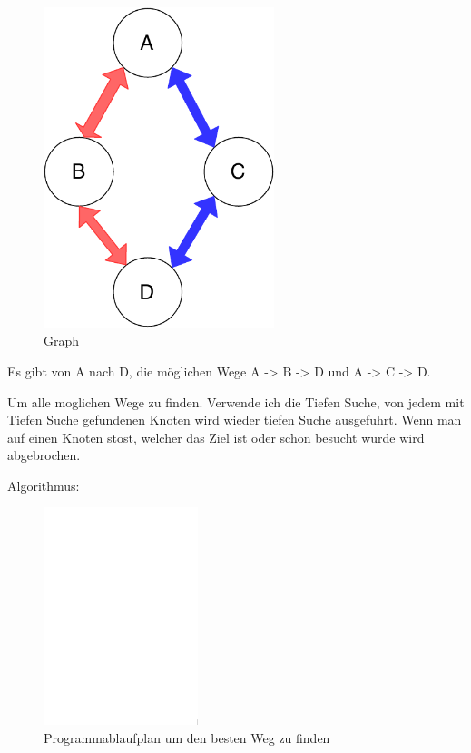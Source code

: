 \documentclass[a4paper,12pt,arial]{scrartcl}
\begin{document}
\begin{figure}[h!]
    \centering
    \includegraphics[width=0.6\textwidth]{small_example_graph.pdf}
    \caption{Graph}
    \label{fig:abbiegen}
\end{figure}
\par
Es gibt von A nach D, die möglichen Wege A -> B -> D und A -> C -> D.


\par
Um alle moglichen Wege zu finden. Verwende ich die Tiefen Suche, von jedem mit Tiefen Suche gefundenen Knoten wird wieder tiefen Suche ausgefuhrt.
Wenn man auf einen Knoten stost, welcher das Ziel ist oder schon besucht wurde wird abgebrochen.

\par
Algorithmus:
\begin{figure}[h!]
    \centering
    \includegraphics[width=0.4\textwidth]{PAP_find_path.pdf}
    \caption{Programmablaufplan um den besten Weg zu finden}
    \label{fig:pap3}
\end{figure}
\end{document}
